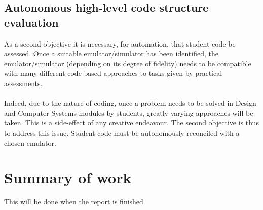 \subsection{Autonomous high-level code structure evaluation}
\label{highLevObj}
As a second objective it is necessary, for automation, that student code be assessed. Once a suitable emulator/simulator has been identified, the emulator/simulator (depending on its degree of fidelity) needs to be compatible with many different code based approaches to tasks given by practical assessments.
\\\\
Indeed, due to the nature of coding, once a problem needs to be solved in Design and Computer Systems modules by students, greatly varying approaches will be taken. This is a side-effect of any creative endeavour. The second objective is thus to address this issue. Student code must be autonomously reconciled with a chosen emulator.

\section{Summary of work}
\label{sow}

\color{green} This will be done when the report is finished\color{black}

